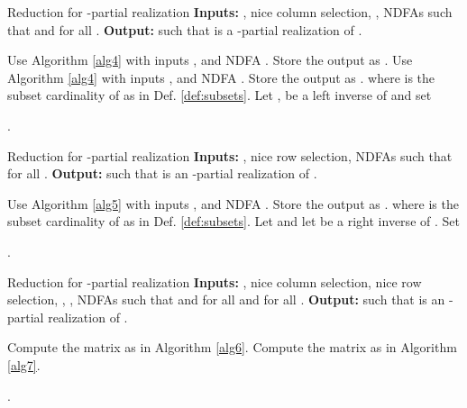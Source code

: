 \documentclass[journal]{IEEEtran}
\begin{document}
\begin{algorithm}
	\caption{Reduction for -partial realization
		\newpage 
		\textbf{Inputs:} ,  nice column selection, ,  NDFAs such that  and  for all .
		\newpage  
		\textbf{Output:}  such that  is a -partial realization of .
	}
	\label{alg6}
	\begin{algorithmic}[1]
		\STATE Use Algorithm \ref{alg4} with inputs ,  and NDFA . Store the output  as .
		\FOR{}
		\STATE  Use Algorithm \ref{alg4} with inputs ,  and NDFA .  Store the output  as .
		\ENDFOR
		\STATE  where  is the subset cardinality of  as in Def. \ref{def:subsets}.
		\STATE
		Let ,  be a left inverse of  and set
		
		\RETURN .
    \end{algorithmic}
\end{algorithm}


\begin{algorithm}
	\caption{Reduction for -partial realization
		\newpage 
		\textbf{Inputs:} ,  nice row selection,  NDFAs such that  for all .
		\newpage  
		\textbf{Output:}  such that  is an -partial realization of .
	}
	\label{alg7}
	\begin{algorithmic}[1]
		\FOR{}
		\STATE  Use Algorithm \ref{alg5} with inputs ,  and NDFA .  Store the output  as .
		\ENDFOR
		\STATE  where  is the subset cardinality of  as in Def. \ref{def:subsets}.
		Let  and let  be a right inverse of . Set
		
		\RETURN .
	\end{algorithmic}
\end{algorithm}

\begin{algorithm}
	\caption{Reduction for -partial realization
		\newpage 
		\textbf{Inputs:} ,  nice column selection,  nice row selection, , ,  NDFAs such that  and  for all  and  for all .
		\newpage  
		\textbf{Output:}  such that  is an -partial realization of .
	}
	\label{alg8}
	\begin{algorithmic}[1]
		\STATE Compute the matrix  as in Algorithm \ref{alg6}.
		\STATE Compute the matrix  as in Algorithm \ref{alg7}.
		\STATE 
		
		\ENDIF
		\RETURN .
	\end{algorithmic}
\end{algorithm}
\end{document}

